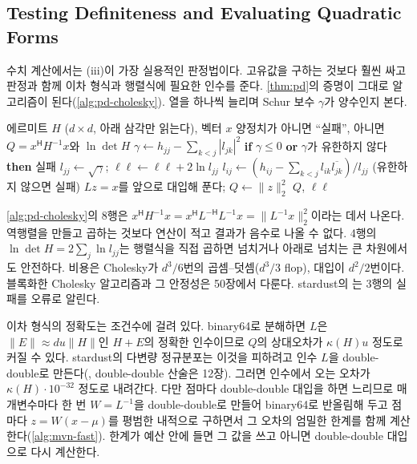 \subsection{Testing Definiteness and Evaluating Quadratic Forms}

수치 계산에서는 (iii)이 가장 실용적인 판정법이다. 고유값을 구하는 것보다 훨씬 싸고 판정과 함께 이차 형식과 행렬식에 필요한 인수를 준다. \cref{thm:pd}의 증명이 그대로 알고리즘이 된다(\cref{alg:pd-cholesky}). 열을 하나씩 늘리며 Schur 보수 $\gamma$가 양수인지 본다.

\begin{algorithm}[htbp]
\begin{algorithmic}[1]
\Require 에르미트 $H$ ($d\times d$, 아래 삼각만 읽는다), 벡터 $x$
\Ensure 양정치가 아니면 ``실패'', 아니면 $Q=x^{\mathsf H}H^{-1}x$와 $\ln\det H$
  \State $\gamma\gets h_{jj}-\sum_{k<j}|l_{jk}|^2$ 
  \State \textbf{if} $\gamma\le0$ \textbf{or} $\gamma$가 유한하지 않다 \textbf{then} \Return 실패
  \State $l_{jj}\gets\sqrt\gamma$; $\ell\ell\gets\ell\ell+2\ln l_{jj}$ 
   $l_{ij}\gets(h_{ij}-\sum_{k<j}l_{ik}\overline{l_{jk}})/l_{jj}$ (유한하지 않으면 실패)
  \EndFor
\EndFor
\State $Lz=x$를 앞으로 대입해 푼다; $Q\gets\|z\|_2^2$ 
\State \Return $Q$, $\ell\ell$
\end{algorithmic}
\caption{Cholesky로 하는 양정치 판정과 이차 형식}
\label{alg:pd-cholesky}
\end{algorithm}

\cref{alg:pd-cholesky}의 8행은 $x^{\mathsf H}H^{-1}x=x^{\mathsf H}L^{-\mathsf H}L^{-1}x=\|L^{-1}x\|_2^2$이라는 데서 나온다. 역행렬을 만들고 곱하는 것보다 연산이 적고 결과가 음수로 나올 수 없다. 4행의 $\ln\det H=2\sum_j\ln l_{jj}$는 행렬식을 직접 곱하면 넘치거나 아래로 넘치는 큰 차원에서도 안전하다. 비용은 Cholesky가 $d^3/6$번의 곱셈–덧셈($d^3/3$ flop), 대입이 $d^2/2$번이다. 블록화한 Cholesky 알고리즘과 그 안정성은 50장에서 다룬다. stardust의 는 3행의 실패를 오류로 알린다.

이차 형식의 정확도는 조건수에 걸려 있다. binary64로 분해하면 $L$은 $\|E\|\approx du\|H\|$인 $H+E$의 정확한 인수이므로 $Q$의 상대오차가 $\kappa(H)u$ 정도로 커질 수 있다. stardust의 다변량 정규분포는 이것을 피하려고 인수 $L$을 double-double로 만든다(, double-double 산술은 12장). 그러면 인수에서 오는 오차가 $\kappa(H)\cdot10^{-32}$ 정도로 내려간다. 다만 점마다 double-double 대입을 하면 느리므로 매개변수마다 한 번 $W=L^{-1}$을 double-double로 만들어 binary64로 반올림해 두고 점마다 $z=W(x-\mu)$를 평범한 내적으로 구하면서 그 오차의 엄밀한 한계를 함께 계산한다(\cref{alg:mvn-fast}). 한계가 예산 안에 들면 그 값을 쓰고 아니면 double-double 대입으로 다시 계산한다.

